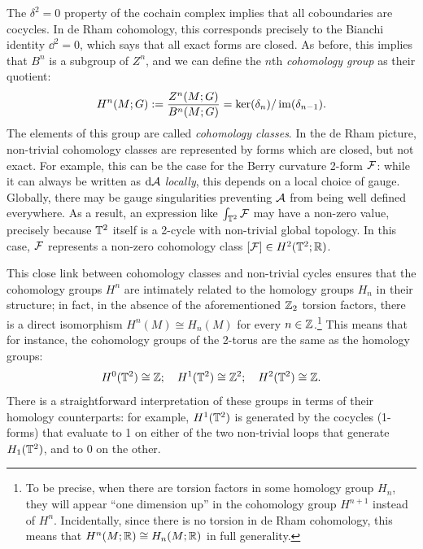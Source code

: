 The $\delta^2 = 0$ property of the cochain complex implies that all coboundaries are cocycles. In de Rham cohomology, this corresponds precisely to the Bianchi identity $\dd^2=0$, which says that all exact forms are closed. As before, this implies that $B^n$ is a subgroup of $Z^n$, and we can define the $n$th \emph{cohomology group} as their quotient:
\begin{equation*}
	H^n(M;G) := \frac{Z^n(M;G)}{B^n(M;G)} = \ker(\delta_n) / \operatorname{im}(\delta_{n-1}).
\end{equation*}
The elements of this group are called \emph{cohomology classes}. In the de Rham picture, non-trivial cohomology classes are represented by forms which are closed, but not exact. For example, this can be the case for the Berry curvature 2-form $\mathcal{F}$: while it can always be written as $\dd{\mathcal{A}}$ \emph{locally}, this depends on a local choice of gauge. Globally, there may be gauge singularities preventing $\mathcal{A}$ from being well defined everywhere. As a result, an expression like $\int_{\mathbb{T}^2}\mathcal{F}$ may have a non-zero value, precisely because $\mathbb{T}^2$ itself is a 2-cycle with non-trivial global topology. In this case, $\mathcal{F}$ represents a non-zero cohomology class $[\mathcal{F}]\in H^2(\mathbb{T}^2;\mathbb{R})$.

This close link between cohomology classes and non-trivial cycles ensures that the cohomology groups $H^n$ are intimately related to the homology groups $H_n$ in their structure; in fact, in the absence of the aforementioned $\mathbb{Z}_2$ torsion factors, there is a direct isomorphism $H^n(M)\cong H_n(M)$ for every $n\in\mathbb{Z}$.\footnote{
	To be precise, when there are torsion factors in some homology group $H_n$, they will appear ``one dimension up'' in the cohomology group $H^{n+1}$ instead of $H^n$. Incidentally, since there is no torsion in de Rham cohomology, this means that $H^n(M;\mathbb{R}) \cong H_n(M;\mathbb{R})$ in full generality.}
This means that for instance, the cohomology groups of the 2-torus are the same as the homology groups:
\begin{equation*}
	H^0(\mathbb{T}^2) \cong \mathbb{Z};\quad H^1(\mathbb{T}^2) \cong \mathbb{Z}^2;\quad H^2(\mathbb{T}^2)\cong \mathbb{Z}.
\end{equation*}
There is a straightforward interpretation of these groups in terms of their homology counterparts: for example, $H^1(\mathbb{T}^2)$ is generated by the cocycles (1-forms) that evaluate to 1 on either of the two non-trivial loops that generate $H_1(\mathbb{T}^2)$, and to 0 on the other.

